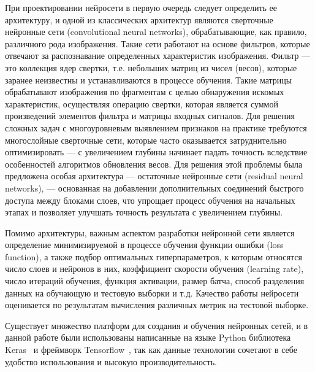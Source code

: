 При проектировании нейросети в первую очередь следует определить ее архитектуру, и одной из классических архитектур являются сверточные нейронные сети (convolutional neural networks), обрабатывающие, как правило, различного рода изображения. Такие сети работают на основе фильтров, которые отвечают за распознавание определенных характеристик изображения. Фильтр --- это коллекция ядер свертки, т.е. небольших матриц из чисел (весов), которые заранее неизвестны и устанавливаются в процессе обучения. Такие матрицы обрабатывают изображения по фрагментам с целью обнаружения искомых характеристик, осуществляя операцию свертки, которая является суммой произведений элементов фильтра и матрицы входных сигналов. Для решения сложных задач с многоуровневым выявлением признаков на практике требуются многослойные сверточные сети, которые часто оказывается затруднительно оптимизировать --- с увеличением глубины начинает падать точность вследствие особенностей алгоритмов обновления весов. Для решения этой проблемы была предложена особая архитектура --- остаточные нейронные сети (residual neural networks), --- основанная на добавлении дополнительных соединений быстрого доступа между блоками слоев, что упрощает процесс обучения на начальных этапах и позволяет улучшать точность результата с увеличением глубины. 

Помимо архитектуры, важным аспектом разработки нейронной сети является определение минимизируемой в процессе обучения функции ошибки (loss function), а также подбор оптимальных гиперпараметров, к которым относятся число слоев и нейронов в них, коэффициент скорости обучения (learning rate), число итераций обучения, функция активации, размер батча, способ разделения данных на обучающую и тестовую выборки и т.д. Качество работы нейросети оценивается по результатам вычисления различных метрик на тестовой выборке.

Существует множество платформ для создания и обучения нейронных сетей, и в данной работе были использованы написанные на языке Python библиотека Keras~\cite{chollet2015keras} и фреймворк Tensorflow~\cite{tensorflow2015-whitepaper}, так как данные технологии сочетают в себе удобство использования и высокую производительность.
